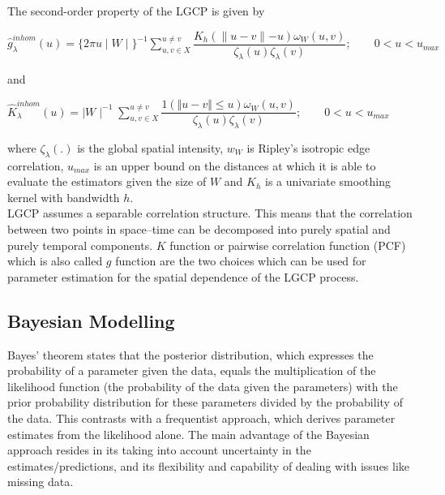 \documentclass[a4paper]{thesis}
\begin{document}
The second-order property of the LGCP is given by 

\begin{center}

$\hat{g}_{\lambda}^{inhom} (u) = \lbrace 2 \pi u  \mid W \mid \rbrace^{-1} \displaystyle \sum_{u,v \in X}^{u \neq v} \dfrac{K_h (\parallel u-v\parallel - u)\omega_W(u,v)}{\zeta_{\lambda}(u)\zeta_{\lambda}(v)} ; \quad \quad 0<u<u_{max}$

\end{center}

and

\begin{center}

$\hat{K}_{\lambda}^{inhom}(u) = \mid W \mid^{-1} \displaystyle  \sum_{u,v \in X}^{u \neq v} \dfrac{1\left( \Vert u - v\Vert \leq u \right)\omega_W(u,v)}{\zeta_{\lambda}(u)\zeta_{\lambda}(v)}; \quad \quad 0<u<u_{max}$

\end{center}

where $\zeta_{\lambda}(.)$ is the global spatial intensity, $w_W$ is Ripley's isotropic edge correlation, $u_{max}$ is an upper bound on the distances at which it is able to evaluate the estimators given the size of $W$ and $K_h$ is a univariate smoothing kernel with bandwidth $h$.\\

LGCP assumes a separable correlation structure. This means that the correlation between two points in space–time can be decomposed into purely spatial and purely
temporal components.\cite{Davies2013} $K$ function or pairwise correlation function (PCF) which is also called $g$ function are the two choices which can be used for parameter estimation for the spatial dependence of the LGCP process.

\subsection{Bayesian Modelling}

Bayes’ theorem states that the posterior distribution, which expresses the probability of a parameter given the data, equals the multiplication of the likelihood function (the probability of the data given the parameters) with the prior probability distribution for these parameters
divided by the probability of the data. This contrasts with a frequentist approach, which derives parameter estimates from the likelihood alone. The main advantage of the Bayesian approach resides in its taking into account uncertainty in the estimates/predictions, and its flexibility and capability of dealing
with issues like missing data.\\
\end{document}
